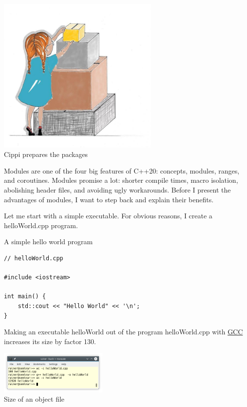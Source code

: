 

\begin{center}
\includegraphics[width=0.6\textwidth]{content/3/chapter4/images/11.png}\\
Cippi prepares the packages
\end{center}

Modules are one of the four big features of C++20: concepts, modules, ranges, and coroutines. Modules promise a lot: shorter compile times, macro isolation, abolishing header files, and avoiding ugly workarounds. Before I present the advantages of modules, I want to step back and explain their benefits.


Let me start with a simple executable. For obvious reasons, I create a helloWorld.cpp program.

\noindent
A simple hello world program
\begin{lstlisting}[style=styleCXX]
// helloWorld.cpp

#include <iostream>

int main() {
	std::cout << "Hello World" << '\n';
}
\end{lstlisting}

Making an executable helloWorld out of the program helloWorld.cpp with \href{http://gcc.gnu.org/}{GCC} increases its size by factor 130.

\begin{center}
\includegraphics[width=0.4\textwidth]{content/3/chapter4/images/12.png}\\
Size of an object file
\end{center}

